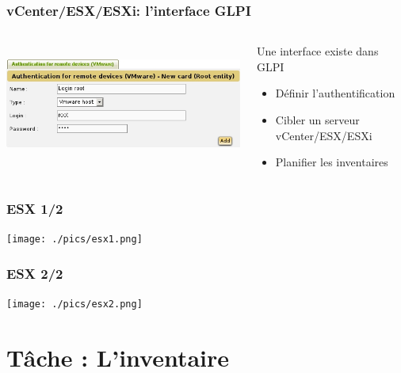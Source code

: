 \documentclass{beamer}
\begin{document}
\begin{frame}[fragile]
    \frametitle{vCenter/ESX/ESXi: l'interface GLPI}

 \begin{columns}
 \begin{column}[T]{4cm}
    \includegraphics[height=4.0cm]{pics/esx-glpi.jpg}
 \end{column}
 \begin{column}[t]{6cm}
    \begin{block}{Une interface existe dans GLPI}
    \begin{itemize}
         \item Définir l'authentification
         \item Cibler un serveur vCenter/ESX/ESXi
         \item Planifier les inventaires
    \end{itemize}
    \end{block}
 \end{column}
\end{columns}




\end{frame}

\begin{frame}
\frametitle{ESX 1/2}


   \texttt{[image: ./pics/esx1.png]}
\end{frame}
%
\begin{frame}
\frametitle{ESX 2/2}


   \texttt{[image: ./pics/esx2.png]}
\end{frame}



\section{Tâche : L'inventaire}
\end{document}
